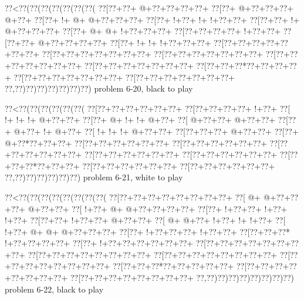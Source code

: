 \vbox{\vbox{\goo
\0??<\0??(\0??(\0??(\0??(\0??(\0??(\0??(
\0??[\0??+\0??+\- @+\0??+\0??+\0??+\0??+
\0??[\0??+\- @+\0??+\0??+\0??+\- @+\0??+
\0??[\0??+\- !+\- @+\- @+\0??+\0??+\0??+
\0??[\0??+\- !+\0??+\- !+\- !+\0??+\0??+
\0??[\0??+\0??+\- !+\- @+\0??+\0??+\0??+
\0??[\0??+\- @+\- @+\- !+\0??+\0??+\0??+
\0??[\0??+\0??+\0??+\0??+\- !+\0??+\0??+
\0??[\0??+\0??+\- @+\0??+\0??+\0??+\0??+
\0??[\0??+\- !+\- !+\- !+\0??+\0??+\0??+
\0??[\0??+\0??+\0??+\0??+\0??+\0??+\0??+
\0??[\0??+\0??+\0??+\0??+\0??+\0??+\0??+
\0??[\0??+\0??+\0??+\0??+\0??+\0??+\0??+
\0??[\0??+\0??+\0??+\0??+\0??+\0??+\0??+
\0??[\0??+\0??+\0??+\0??+\0??+\0??+\0??+
\0??[\0??+\0??+\0??*\0??+\0??+\0??+\0??+
\0??[\0??+\0??+\0??+\0??+\0??+\0??+\0??+
\0??[\0??+\0??+\0??+\0??+\0??+\0??+\0??+
\0??,\0??)\0??)\0??)\0??)\0??)\0??)\0??)
}
\hfil problem 6-20, black to play\hfil\break
}

\vbox{\vbox{\goo
\0??<\0??(\0??(\0??(\0??(\0??(\0??(
\0??[\0??+\0??+\0??+\0??+\0??+\0??+
\0??[\0??+\0??+\0??+\0??+\- !+\0??+
\0??[\- !+\- !+\- !+\- @+\0??+\0??+
\0??[\0??+\- @+\- !+\- !+\- @+\0??+
\0??[\- @+\0??+\0??+\- @+\0??+\0??+
\0??[\0??+\- @+\0??+\- !+\- @+\0??+
\0??[\- !+\- !+\- !+\- @+\0??+\0??+
\0??[\0??+\0??+\0??+\- @+\0??+\0??+
\0??[\0??+\- @+\0??*\0??+\0??+\0??+
\0??[\0??+\0??+\0??+\0??+\0??+\0??+
\0??[\0??+\0??+\0??+\0??+\0??+\0??+
\0??[\0??+\0??+\0??+\0??+\0??+\0??+
\0??[\0??+\0??+\0??+\0??+\0??+\0??+
\0??[\0??+\0??+\0??+\0??+\0??+\0??+
\0??[\0??+\0??+\0??*\0??+\0??+\0??+
\0??[\0??+\0??+\0??+\0??+\0??+\0??+
\0??[\0??+\0??+\0??+\0??+\0??+\0??+
\0??,\0??)\0??)\0??)\0??)\0??)\0??)
}
\hfil problem 6-21, white to play\hfil\break
}

\vbox{\vbox{\goo
\0??<\0??(\0??(\0??(\0??(\0??(\0??(\0??(\0??(
\0??[\0??+\0??+\0??+\0??+\0??+\0??+\0??+\0??+
\0??[\- @+\- @+\0??+\0??+\0??+\- @+\0??+\0??+
\0??[\- !+\0??+\- @+\- @+\0??+\0??+\0??+\0??+
\0??[\0??+\- !+\0??+\0??+\- !+\0??+\- !+\0??+
\0??[\0??+\0??+\- !+\0??+\0??+\- @+\0??+\0??+
\0??[\- @+\- @+\0??+\- !+\0??+\- !+\- !+\0??+
\0??[\- !+\0??+\- @+\- @+\- @+\0??+\0??+\0??+
\0??[\0??+\- !+\0??+\0??+\0??+\- !+\0??+\0??+
\0??[\0??+\0??+\0??*\- !+\0??+\0??+\0??+\0??+
\0??[\0??+\- !+\0??+\0??+\0??+\0??+\0??+\0??+
\0??[\0??+\0??+\0??+\0??+\0??+\0??+\0??+\0??+
\0??[\0??+\0??+\0??+\0??+\0??+\0??+\0??+\0??+
\0??[\0??+\0??+\0??+\0??+\0??+\0??+\0??+\0??+
\0??[\0??+\0??+\0??+\0??+\0??+\0??+\0??+\0??+
\0??[\0??+\0??+\0??*\0??+\0??+\0??+\0??+\0??+
\0??[\0??+\0??+\0??+\0??+\0??+\0??+\0??+\0??+
\0??[\0??+\0??+\0??+\0??+\0??+\0??+\0??+\0??+
\0??,\0??)\0??)\0??)\0??)\0??)\0??)\0??)\0??)
}
\hfil problem 6-22, black to play\hfil\break
}

